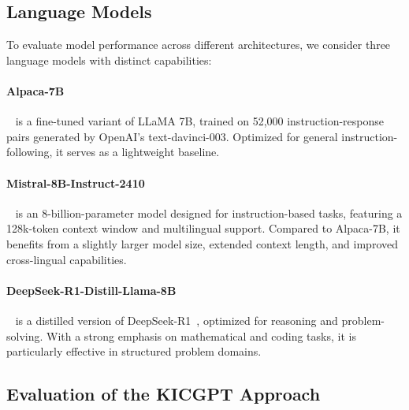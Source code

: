 \documentclass[12pt,a4paper]{article}
\begin{document}
\subsection{Language Models}

To evaluate model performance across different architectures, we consider three language models with distinct capabilities:

\paragraph{Alpaca-7B}~\cite{taori2023stanford} is a fine-tuned variant of LLaMA 7B, trained on 52,000 instruction-response pairs generated by OpenAI’s text-davinci-003.
Optimized for general instruction-following, it serves as a lightweight baseline.

\paragraph{Mistral-8B-Instruct-2410}~\cite{mistralai2024ministral8b} is an 8-billion-parameter model designed for instruction-based tasks, featuring a 128k-token context window and multilingual support.
Compared to Alpaca-7B, it benefits from a slightly larger model size, extended context length, and improved cross-lingual capabilities.

\paragraph{DeepSeek-R1-Distill-Llama-8B}~\cite{deepseekai2025deepseekr1distillllama8b} is a distilled version of DeepSeek-R1~\cite{guo2025deepseek}, optimized for reasoning and problem-solving.
With a strong emphasis on mathematical and coding tasks, it is particularly effective in structured problem domains.

\subsection{Evaluation of the KICGPT Approach}
\end{document}
